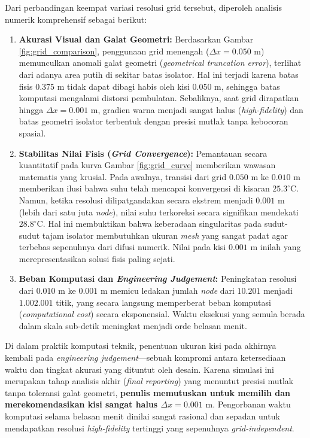 \documentclass[12pt,a4paper]{article}
\begin{document}
Dari perbandingan keempat variasi resolusi grid tersebut, diperoleh analisis numerik komprehensif sebagai berikut:
\begin{enumerate}
    \item \textbf{Akurasi Visual dan Galat Geometri:} 
    Berdasarkan Gambar \ref{fig:grid_comparison}, penggunaan grid menengah ($\Delta x = 0.050\text{ m}$) memunculkan anomali galat geometri (\textit{geometrical truncation error}), terlihat dari adanya area putih di sekitar batas isolator. Hal ini terjadi karena batas fisis $0.375\text{ m}$ tidak dapat dibagi habis oleh kisi $0.050\text{ m}$, sehingga batas komputasi mengalami distorsi pembulatan. Sebaliknya, saat grid dirapatkan hingga $\Delta x = 0.001\text{ m}$, gradien warna menjadi sangat halus (\textit{high-fidelity}) dan batas geometri isolator terbentuk dengan presisi mutlak tanpa kebocoran spasial.

    \item \textbf{Stabilitas Nilai Fisis (\textit{Grid Convergence}):} 
    Pemantauan secara kuantitatif pada kurva Gambar \ref{fig:grid_curve} memberikan wawasan matematis yang krusial. Pada awalnya, transisi dari grid $0.050\text{ m}$ ke $0.010\text{ m}$ memberikan ilusi bahwa suhu telah mencapai konvergensi di kisaran $25.3^\circ\text{C}$. Namun, ketika resolusi dilipatgandakan secara ekstrem menjadi $0.001\text{ m}$ (lebih dari satu juta \textit{node}), nilai suhu terkoreksi secara signifikan mendekati $28.8^\circ\text{C}$. Hal ini membuktikan bahwa keberadaan singularitas pada sudut-sudut tajam isolator membutuhkan ukuran \textit{mesh} yang sangat padat agar terbebas sepenuhnya dari difusi numerik. Nilai pada kisi $0.001\text{ m}$ inilah yang merepresentasikan solusi fisis paling sejati.

    \item \textbf{Beban Komputasi dan \textit{Engineering Judgement}:} 
    Peningkatan resolusi dari $0.010\text{ m}$ ke $0.001\text{ m}$ memicu ledakan jumlah \textit{node} dari $10.201$ menjadi $1.002.001$ titik, yang secara langsung memperberat beban komputasi (\textit{computational cost}) secara eksponensial. Waktu eksekusi yang semula berada dalam skala sub-detik meningkat menjadi orde belasan menit. 
\end{enumerate}

Di dalam praktik komputasi teknik, penentuan ukuran kisi pada akhirnya kembali pada \textit{engineering judgement}—sebuah kompromi antara ketersediaan waktu dan tingkat akurasi yang dituntut oleh desain. Karena simulasi ini merupakan tahap analisis akhir (\textit{final reporting}) yang menuntut presisi mutlak tanpa toleransi galat geometri, \textbf{penulis memutuskan untuk memilih dan merekomendasikan kisi sangat halus $\Delta x = 0.001\text{ m}$}. Pengorbanan waktu komputasi selama belasan menit dinilai sangat rasional dan sepadan untuk mendapatkan resolusi \textit{high-fidelity} tertinggi yang sepenuhnya \textit{grid-independent}.
\end{document}
